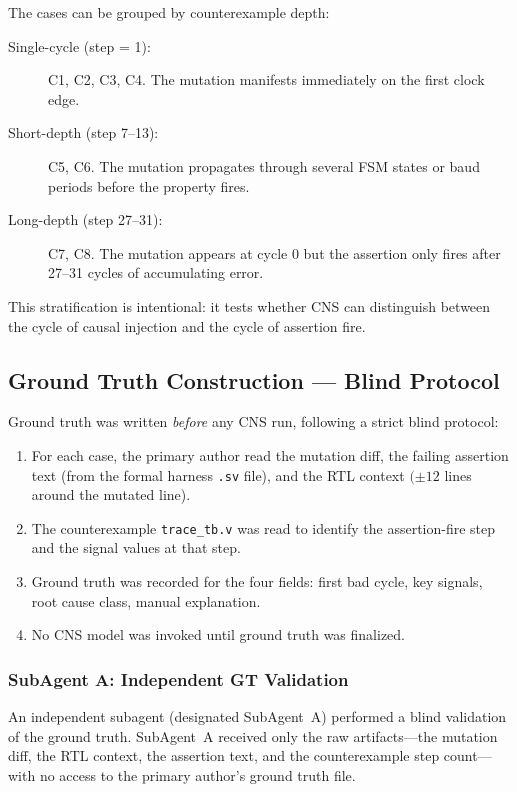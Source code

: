 \documentclass[11pt,a4paper]{article}
\begin{document}
\noindent The cases can be grouped by counterexample depth:
\begin{description}
  \item[Single-cycle (step = 1):] C1, C2, C3, C4. The mutation manifests
    immediately on the first clock edge.
  \item[Short-depth (step 7--13):] C5, C6. The mutation propagates through
    several FSM states or baud periods before the property fires.
  \item[Long-depth (step 27--31):] C7, C8. The mutation appears at cycle 0 but
    the assertion only fires after 27--31 cycles of accumulating error.
\end{description}

This stratification is intentional: it tests whether CNS can distinguish
between the cycle of causal injection and the cycle of assertion fire.

\subsection{Ground Truth Construction --- Blind Protocol}

Ground truth was written \emph{before} any CNS run, following a strict blind
protocol:

\begin{enumerate}
  \item For each case, the primary author read the mutation diff, the failing
    assertion text (from the formal harness \texttt{.sv} file), and the RTL
    context $(\pm 12$ lines around the mutated line).
  \item The counterexample \texttt{trace\_tb.v} was read to identify the
    assertion-fire step and the signal values at that step.
  \item Ground truth was recorded for the four fields: first bad cycle, key
    signals, root cause class, manual explanation.
  \item No CNS model was invoked until ground truth was finalized.
\end{enumerate}

\subsubsection{SubAgent A: Independent GT Validation}

An independent subagent (designated SubAgent~A) performed a blind validation of
the ground truth. SubAgent~A received only the raw artifacts---the mutation
diff, the RTL context, the assertion text, and the counterexample step count---
with no access to the primary author's ground truth file.
\end{document}
